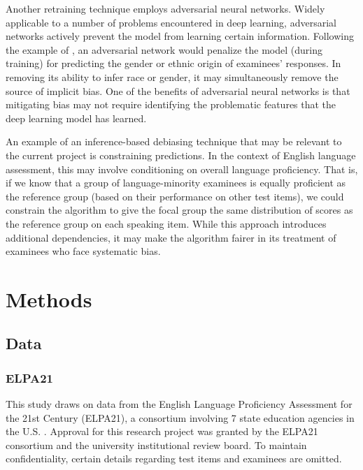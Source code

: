 \documentclass [PhD] {uclathes}
\begin{document}
Another retraining technique employs adversarial neural networks. Widely applicable to a number of problems encountered in deep learning, adversarial networks actively prevent the model from learning certain information. Following the example of \citet{zhang2018mitigating}, an adversarial network would penalize the model (during training) for predicting the gender or ethnic origin of examinees’ responses. In removing its ability to infer race or gender, it may simultaneously remove the source of implicit bias. One of the benefits of adversarial neural networks is that mitigating bias may not require identifying the problematic features that the deep learning model has learned.

An example of an inference-based debiasing technique that may be relevant to the current project is constraining predictions. In the context of English language assessment, this may involve conditioning on overall language proficiency. That is, if we know that a group of language-minority examinees is equally proficient as the reference group (based on their performance on other test items), we could constrain the algorithm to give the focal group the same distribution of scores as the reference group on each speaking item. While this approach introduces additional dependencies, it may make the algorithm fairer in its treatment of examinees who face systematic bias.



\chapter{Methods}

\section{Data}

\subsection{ELPA21}

This study draws on data from the English Language Proficiency Assessment for the 21st Century (ELPA21), a consortium involving 7 state education agencies in the U.S. \citep{huang2018english}. Approval for this research project was granted by the ELPA21 consortium and the university institutional review board. To maintain confidentiality, certain details regarding test items and examinees are omitted. 
\end{document}
